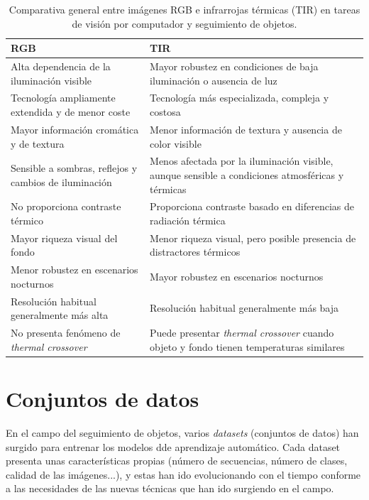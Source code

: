 {\begin{table}[htbp]
    \centering
    \small
    \renewcommand{\arraystretch}{1.3}
    \begin{tabular}{p{} p{}}
        \toprule
        \textbf{RGB} & \textbf{TIR} \\
        \midrule
        Alta dependencia de la iluminación visible & Mayor robustez en condiciones de baja iluminación o ausencia de luz \\
        Tecnología ampliamente extendida y de menor coste & Tecnología más especializada, compleja y costosa \\
        Mayor información cromática y de textura & Menor información de textura y ausencia de color visible \\
        Sensible a sombras, reflejos y cambios de iluminación & Menos afectada por la iluminación visible, aunque sensible a condiciones atmosféricas y térmicas \\
        No proporciona contraste térmico & Proporciona contraste basado en diferencias de radiación térmica \\
        Mayor riqueza visual del fondo & Menor riqueza visual, pero posible presencia de distractores térmicos \\
        Menor robustez en escenarios nocturnos & Mayor robustez en escenarios nocturnos \\
        Resolución habitual generalmente más alta & Resolución habitual generalmente más baja \\
        No presenta fenómeno de \textit{thermal crossover} & Puede presentar \textit{thermal crossover} cuando objeto y fondo tienen temperaturas similares \\
        \bottomrule
    \end{tabular}
    \caption{Comparativa general entre imágenes RGB e infrarrojas térmicas (TIR) en tareas de visión por computador y seguimiento de objetos.}
    \label{tab:comparacion-rgb-tir}
\end{table}

\par}

\section{Conjuntos de datos}

En el campo del seguimiento de objetos, varios \textit{datasets} (conjuntos de datos) han surgido para entrenar los modelos dde aprendizaje automático. Cada dataset presenta unas características propias (número de secuencias, número de clases, calidad de las imágenes...), y estas han ido evolucionando con el tiempo conforme a las necesidades de las nuevas técnicas que han ido surgiendo en el campo.

